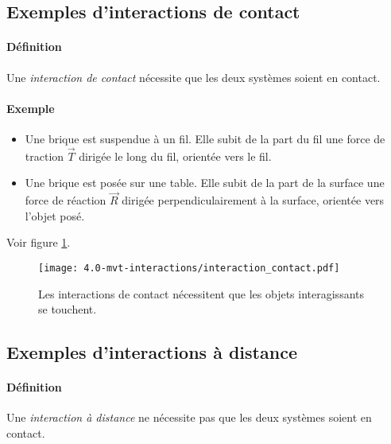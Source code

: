 \subsection{Exemples d'interactions de contact}
\paragraph{Définition} Une \textit{interaction de contact} nécessite que les deux systèmes soient en contact.
\paragraph{Exemple} 
\begin{itemize}
 \item Une brique est suspendue à un fil. Elle subit de la part du fil une force de traction $\overrightarrow{T}$ dirigée le long du fil, orientée vers le fil. 
 \item Une brique est posée sur une table. Elle subit de la part de la surface une force de réaction $\overrightarrow{R}$ dirigée perpendiculairement à la surface, orientée vers l'objet posé. 
\end{itemize}
Voir figure \ref{fig:interaction_contact}.
\begin{figure}[h!]
  \begin{center}
      \texttt{[image: 4.0-mvt-interactions/interaction\_contact.pdf]}
  \end{center}
  \caption{Les interactions de contact nécessitent que les objets interagissants se touchent. }
  \label{fig:interaction_contact}
\end{figure}

\subsection{Exemples d'interactions à distance}
\paragraph{Définition} Une \textit{interaction à distance} ne nécessite pas que les deux systèmes soient en contact.

